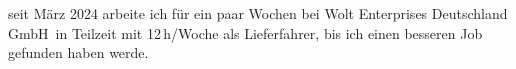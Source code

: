 		seit März 2024 arbeite ich für ein paar Wochen bei \glqq Wolt Enterprises Deutschland GmbH\grqq\ in Teilzeit mit 12\,h/Woche als Lieferfahrer, bis ich einen besseren Job gefunden haben werde.